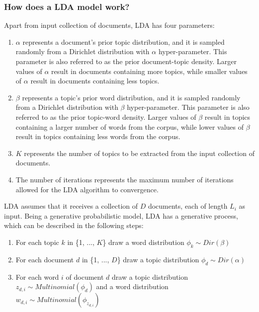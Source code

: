         \subsubsection{How does a LDA model work?}
        
            Apart from input collection of documents, LDA has four parameters:
            
            \begin{enumerate}
                \item $\alpha$ represents a document’s prior topic distribution, and it is sampled randomly from a Dirichlet distribution with $\alpha$ hyper-parameter. This parameter is also referred to as the prior document-topic density. Larger values of $\alpha$ result in documents containing more topics, while smaller values of $\alpha$ result in documents containing less topics. 
                
                \item $\beta$ represents a topic’s prior word distribution, and it is sampled randomly from a Dirichlet distribution with $\beta$ hyper-parameter. This parameter is also referred to as the prior topic-word density. Larger values of $\beta$ result in topics containing a larger number of words from the corpus, while lower values of $\beta$ result in topics containing less words from the corpus.
                
                \item $K$ represents the number of topics to be extracted from the input collection of documents.
                
                \item The number of iterations represents the maximum number of iterations allowed for the LDA algorithm to convergence.
            \end{enumerate}
        
            LDA assumes that it receives a collection of $D$ documents, each of length $L_i$ as input. Being a generative probabilistic model, LDA has a generative process, which can be described in the following steps:
            
            \begin{enumerate}
                \item For each topic $k$ in \{1, ..., $K$\} draw a word distribution $\phi_k \sim Dir(\beta)$
                \item For each document $d$ in \{1, ..., $D$\} draw a topic distribution $\phi_d \sim Dir(\alpha)$
                \item For each word $i$ of document $d$ draw a topic distribution $z_{d,i} \sim Multinomial(\phi_d)$ and a word distribution $w_{d,i} \sim Multinomial(\phi_{z_{d,i}})$
            \end{enumerate}
            
